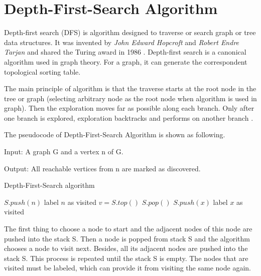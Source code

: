 \documentclass[11pt,times,oneside,openright,hardcopy]{eeereport}
\begin{document}
\section{Depth-First-Search Algorithm}
Depth-first search (DFS) is algorithm designed to traverse or search graph or tree data structures.
It was invented by \emph{John Edward Hopcroft} and \emph{Robert Endre Tarjan} and shared the Turing award in 1986 \cite{Jeuring:1995to}.
Depth-first search is a canonical algorithm used in graph theory. For a graph, it can generate the correspondent topological sorting table.

The main principle of algorithm is that the traverse starts at the root node in the tree or graph (selecting arbitrary node as the root node when algorithm is used in graph).
Then the exploration moves far as possible along each branch. Only after one branch is explored, exploration backtracks and performs on another branch \cite{Gibbons:1985wz}.

The pseudocode of Depth-First-Search Algorithm is shown as following.

Input: A graph G and a vertex n of G.

Output: All reachable vertices from n are marked as discovered.

\begin{algorithm}
    \caption{Depth-First-Search algorithm}
    \begin{algorithmic}[1]
       \State $S.push(n)$
       \State label $n$ as visited
            \State $v = S.top()$
            \State $S.pop()$
                \State $S.push(x)$
                \State label $x$ as visited
                \EndIf
            \EndFor
       \EndWhile
    \EndProcedure
    \end{algorithmic}
\end{algorithm}

The first thing to choose a node to start and the adjacent nodes of this node are pushed into the stack S.
Then a node is popped from stack S and the algorithm chooses a node to visit next. Besides, all its adjacent nodes are pushed into the stack S.
This process is repeated until the stack S is empty. The nodes that are visited must be labeled, which can provide it from visiting the same
node again.
\end{document}

